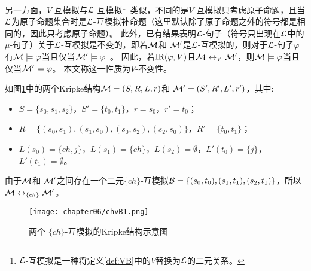 另一方面，$V$-互模拟与${\cal L}$-互模拟\footnote{${\cal L}$-互模拟是一种将定义\ref{def:VB}中的$V$替换为${\cal L}$的二元关系。}~\cite{d1996uniform}类似，不同的是$V$-互模拟只考虑原子命题，且当${\cal L}$为原子命题集合时是${\cal L}$-互模拟补命题（这里默认除了原子命题之外的符号都是相同的，因此只考虑原子命题）。
此外，已有结果表明${\cal L}$-句子（符号只出现在${\cal L}$中的$\mu$-句子）关于${\cal L}$-互模拟是不变的，即若${\cal M}$和 ${\cal M}'$是${\cal L}$-互模拟的，则对于${\cal L}$-句子$\varphi$有${\cal M} \models \varphi$当且仅当${\cal M}' \models \varphi$~\cite{d1996uniform,bradfield2018mu}。
因此，若$\textrm{IR}(\varphi, V)$且${\cal M} \leftrightarrow_V {\cal M}'$，则${\cal M} \models \varphi$当且仅当${\cal M}' \models \varphi$。
本文称这一性质为$V$-不变性。
\begin{example}
	如图\ref{chapter06:fig:bisim}中的两个Kripke结构${\cal M}=(S,R,L,r)$和 ${\cal M}'=(S',R',L',r')$，其中:
	\begin{itemize}
		\item $S=\{s_0,s_1,s_2\}$，$S'=\{t_0,t_1\}$，$r=s_0$，$r'=t_0$；
		\item $R=\{(s_0,s_1),(s_1,s_0),(s_0,s_2),(s_2,s_0)\}$，$R'=\{t_0,t_1\}$；
		\item $L(s_0)=\{ch,j\}$，$L(s_1)=\{ch\}$，$L(s_2)=\emptyset$，$L'(t_0)=\{j\}$，$L'(t_1)=\emptyset$。
	\end{itemize}
	由于${\cal M}$和 ${\cal M}'$之间存在一个二元$\{ch\}$-互模拟${\cal B}=\{(s_0, t_0), (s_1, t_1), (s_2, t_1)\}$，所以 ${\cal M} \leftrightarrow_{\{ch\}} {\cal M}'$。%
	
	
	
	
	\begin{figure}[h]%
		\centering
		\texttt{[image: chapter06/chvB1.png]}
		\caption{两个 $\{ch\}$-互模拟的Kripke结构示意图}\label{chapter06:fig:bisim}
		
	\end{figure}
	
\end{example}

